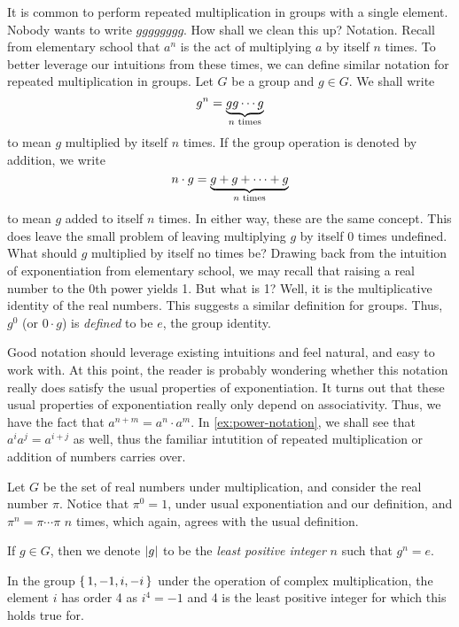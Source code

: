 \documentclass[./algebra-notes.tex]{subfiles}
\begin{document}
It is common to perform repeated multiplication in groups with a single element.
Nobody wants to write $gggggggg$. How shall we clean this up? Notation. Recall
from elementary school that $a^n$ is the act of multiplying $a$ by itself $n$
times. To better leverage our intuitions from these times, we can define similar
notation for repeated multiplication in groups. Let $G$ be a group and $g \in
G$. We shall write 
\[
    g^n = {\underbrace{gg \cdots g}_{\text{$n$ times}}}
\]
to mean $g$ multiplied by itself $n$ times. If the group operation is denoted by
addition, we write 
\[
    n \cdot g = {\underbrace{g + g + \cdots + g}_{\text{$n$ times}}}
\]
to mean $g$ added to itself $n$ times. In either way, these are the same
concept. This does leave the small problem of leaving multiplying $g$ by
itself 0 times undefined. What should $g$ multiplied by itself no times be?
Drawing back from the intuition of exponentiation from elementary school, we may
recall that raising a real number to the 0th power yields 1. But what is 1?
Well, it is the multiplicative identity of the real numbers. This suggests a
similar definition for groups. Thus, $g^0$ (or $0 \cdot g$) is \emph{defined} to
be $e$, the group identity. 

Good notation should leverage existing intuitions and feel natural, and easy to
work with. At this point, the reader is probably wondering whether this notation
really does satisfy the usual properties of exponentiation. It turns out that
these usual properties of exponentiation really only depend on associativity.
Thus, we have the fact that $a^{n+m} = a^n \cdot a^m$. In
\cref{ex:power-notation}, we shall see that $a^i a^j = a^{i+j}$ as well, thus
the familiar intutition of repeated multiplication or addition of numbers
carries over.

\begin{example}
    Let $G$ be the set of real numbers under multiplication, and consider the
    real number $\pi$. Notice that $\pi^0 = 1$, under usual exponentiation and
    our definition, and $\pi^n = \pi \cdots \pi$ $n$ times, which again, agrees
    with the usual definition.
\end{example}

\begin{definition}
    If $g \in G$, then we denote $\abs g$ to be the \emph{least positive
    integer} $n$ such that $g^n = e$. 
\end{definition}

\begin{example}
    In the group $\set{1, -1, i, -i}$ under the operation of complex
    multiplication, the element $i$ has order 4 as $i^4 = -1$ and 4 is the least
    positive integer for which this holds true for.
\end{example}
\end{document}
